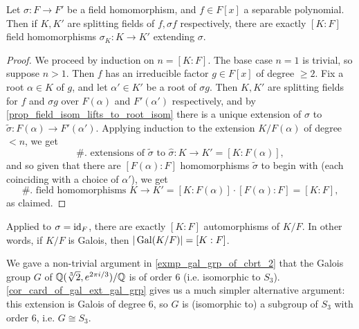 \begin{theorem}
    Let $\sigma: F \to F'$ be a field homomorphism, and $f \in F[x]$ a separable polynomial. Then if $K, K'$ are splitting fields of $f, \sigma f$ respectively, there are exactly $[K : F]$ field homomorphisms $\sigma_K: K \to K'$ extending $\sigma$.
\end{theorem}

\begin{proof}
    We proceed by induction on $n = [K : F]$. The base case $n = 1$ is trivial, so suppose $n > 1$. Then $f$ has an irreducible factor $g \in F[x]$ of degree $\geq 2$. Fix a root $\alpha \in K$ of $g$, and let $\alpha' \in K'$ be a root of $\sigma g$. Then $K, K'$ are splitting fields for $f$ and $\sigma g$ over $F(\alpha)$ and $F'(\alpha')$ respectively, and by \cref{prop_field_isom_lifts_to_root_isom} there is a unique extension of $\sigma$ to $\widetilde{\sigma}: F(\alpha) \to F'(\alpha')$. Applying induction to the extension $K/F(\alpha)$ of degree $< n$, we get
    \[
        \#. \text{ extensions of } \widetilde{\sigma} \text{ to } \hat{\sigma}: K \to K' = [K : F(\alpha)],
    \]
    and so given that there are $[F(\alpha) : F]$ homomorphisms $\widetilde{\sigma}$ to begin with (each coinciding with a choice of $\alpha'$), we get
    \[
        \#. \text{ field homomorphisms } K \to K' = [K : F(\alpha)] \cdot [F(\alpha) : F] = [K : F],
    \]
    as claimed.
\end{proof}

\begin{corollary}
\label{cor_card_of_gal_ext_gal_grp}
    Applied to $\sigma = \operatorname{id}_{F}$, there are exactly $[K : F]$ automorphisms of $K/F$. In other words, if $K/F$ is Galois, then $|\operatorname{Gal}(K/F)| = [K : F]$.
\end{corollary}

\begin{example}
    We gave a non-trivial argument in \cref{exmp_gal_grp_of_cbrt_2} that the Galois group $G$ of $\mathbb{{Q}}(\sqrt[3]{2}, e^{2\pi i/3})/\mathbb{{Q}}$ is of order 6 (i.e. isomorphic to $S_3$). \cref{cor_card_of_gal_ext_gal_grp} gives us a much simpler alternative argument: this extension is Galois of degree 6, so $G$ is (isomorphic to) a subgroup of $S_3$ with order 6, i.e. $G \cong S_3$.
\end{example}
